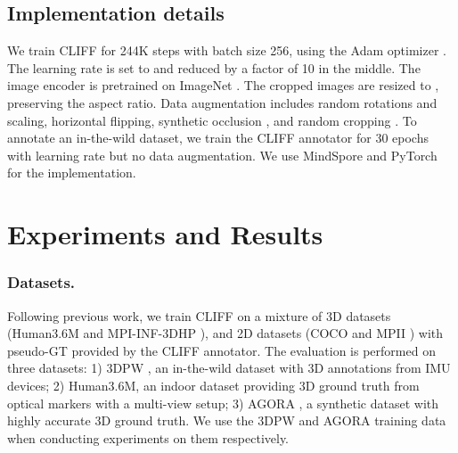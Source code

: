 \documentclass[runningheads]{llncs}
\begin{document}
\subsection{Implementation details}
We train CLIFF for 244K steps with batch size 256, using the Adam optimizer \cite{kingma2015adam}.
The learning rate is set to  and reduced by a factor of 10 in the middle.
The image encoder is pretrained on ImageNet \cite{deng2009imagenet}.
The cropped images are resized to , preserving the aspect ratio.
Data augmentation includes random rotations and scaling, horizontal flipping, synthetic occlusion \cite{sarandi2018robust}, and random cropping \cite{joo2021exemplar,rockwell2020full}.
To annotate an in-the-wild dataset, we train the CLIFF annotator for 30 epochs with learning rate  but no data augmentation.
We use MindSpore \cite{ms} and PyTorch \cite{paszke2019pytorch} for the implementation.

\section{Experiments and Results}

\subsubsection{Datasets.}
Following previous work, we train CLIFF on a mixture of 3D datasets (Human3.6M \cite{ionescu2013human3} and MPI-INF-3DHP \cite{mehta2017monocular}), and 2D datasets (COCO \cite{lin2014microsoft} and MPII \cite{andriluka20142d}) with pseudo-GT provided by the CLIFF annotator.
The evaluation is performed on three datasets: 1) 3DPW \cite{von2018recovering}, an in-the-wild dataset with 3D annotations from IMU devices; 2) Human3.6M, an indoor dataset providing 3D ground truth from optical markers with a multi-view setup; 3) AGORA \cite{patel2021agora}, a synthetic dataset with highly accurate 3D ground truth.
We use the 3DPW and AGORA training data when conducting experiments on them respectively.
\end{document}
